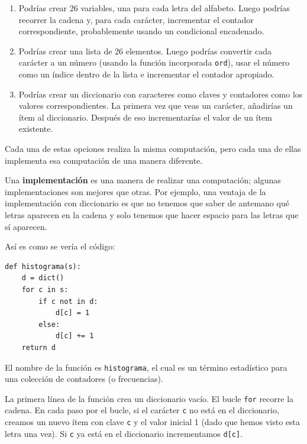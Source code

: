 \documentclass[10pt]{book}
\begin{document}
\begin{enumerate}

\item Podrías crear 26 variables, una para cada letra del
alfabeto.  Luego podrías recorrer la cadena y, para cada
carácter, incrementar el contador correspondiente, probablemente usando
un condicional encadenado.

\item Podrías crear una lista de 26 elementos.  Luego podrías
convertir cada carácter a un número (usando la función incorporada
{\tt ord}), usar el número como un índice dentro de la lista e incrementar
el contador apropiado.

\item Podrías crear un diccionario con caracteres como claves
y contadores como los valores correspondientes.  La primera vez que
veas un carácter, añadirías un ítem al diccionario.  Después
de eso incrementarías el valor de un ítem existente.

\end{enumerate}

Cada una de estas opciones realiza la misma computación, pero cada una
de ellas implementa esa computación de una manera diferente.

Una {\bf implementación} es una manera de realizar una computación;
algunas implementaciones son mejores que otras.  Por ejemplo,
una ventaja de la implementación con diccionario es que no
tenemos que saber de antemano qué letras aparecen en la cadena
y solo tenemos que hacer espacio para las letras que sí aparecen.

Así es como se vería el código:

\begin{verbatim}
def histograma(s):
    d = dict()
    for c in s:
        if c not in d:
            d[c] = 1
        else:
            d[c] += 1
    return d
\end{verbatim}
%
El nombre de la función es {\tt histograma}, el cual es un término
estadístico para una colección de contadores (o frecuencias).

La primera línea de la
función crea un diccionario vacío.  El bucle {\tt for} recorre
la cadena.  En cada paso por el bucle, si el carácter {\tt c} no
está en el diccionario, creamos un nuevo ítem con clave {\tt c} y el
valor inicial 1 (dado que hemos visto esta letra una vez).  Si {\tt c}
ya está en el diccionario incrementamos {\tt d[c]}.
\end{document}
